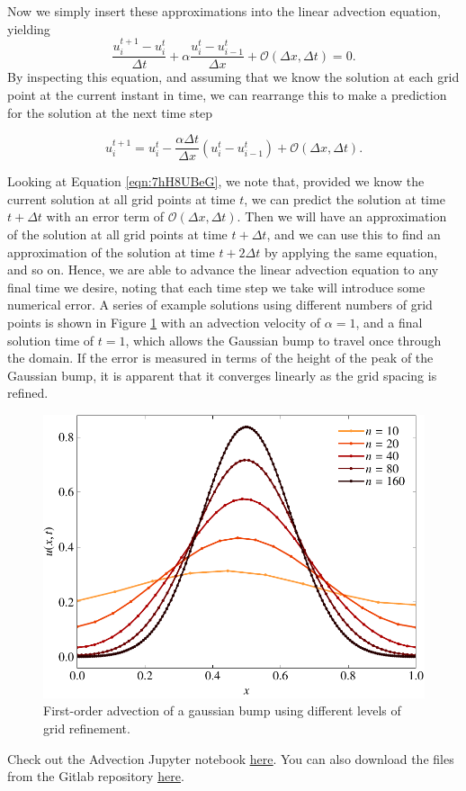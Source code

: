 Now we simply insert these approximations into the linear advection equation, yielding
\begin{equation}
	\frac{u_i^{t+1} - u_{i}^t}{\Delta t} +  \alpha \frac{u_i^t - u_{i-1}^t}{\Delta x} + \mathcal{O}(\Delta x, \Delta t) = 0.
\end{equation}
By inspecting this equation, and assuming that we know the solution at each grid point at the current instant in time, we can rearrange this to make a prediction for the solution at the next time step
\begin{eqBox}
\begin{equation}
	u_i^{t+1} = u_{i}^t -\frac{\alpha \Delta t}{\Delta x} \left( u_i^t - u_{i-1}^t \right) + \mathcal{O}(\Delta x, \Delta t).
	\label{eqn:7hH8UBeG}
\end{equation}
\end{eqBox}

Looking at Equation \ref{eqn:7hH8UBeG}, we note that, provided we know the current solution at all grid points at time $t$, we can predict the solution at time $t+\Delta t$ with an error term of $\mathcal{O}(\Delta x, \Delta t)$. Then we will have an approximation of the solution at all grid points at time $t+\Delta t$, and we can use this to find an approximation of the solution at time $t+2\Delta t$ by applying the same equation, and so on. Hence, we are able to advance the linear advection equation to any final time we desire, noting that each time step we take will introduce some numerical error. A series of example solutions using different numbers of grid points is shown in Figure \ref{fig:advection_upwind} with an advection velocity of $\alpha = 1$, and a final solution time of $t=1$, which allows the Gaussian bump to travel once through the domain. If the error is measured in terms of the height of the peak of the Gaussian bump, it is apparent that it converges linearly as the grid spacing is refined.
\begin{figure}[htbp]
	\centering
	\includegraphics[width=0.65\linewidth]{Pictures/advection_upwind}
	\caption{First-order advection of a gaussian bump using different levels of grid refinement.}
	\label{fig:advection_upwind}
\end{figure}
\begin{jupyternote}
	Check out the Advection Jupyter notebook \href{\binderurl}{\underline{here}}. You can also download the files from the Gitlab repository \href{\repourl}{\underline{here}}.
\end{jupyternote}
